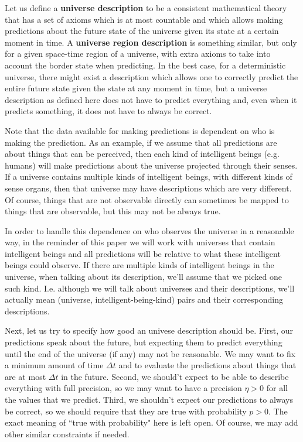 \documentclass[a4paper
,draft
]{article}
\newcommand{\definitie}[1]{\textbf{#1}}
\newcommand{\ghilimele}[1]{``#1"}
\begin{document}
Let us define a \definitie{universe description} to be a
consistent mathematical theory that has
a set of axioms which is at most countable and which allows making
predictions about the future state of the universe given its state
at a certain moment in time. A \definitie{universe region description}
is something similar, but only for a given space-time region of a universe,
with extra axioms to take into account the border state when predicting.
In the best case, for a deterministic universe, there might exist
a description which allows one to correctly predict the entire future state
given the state at any moment in time, but a universe description
as defined here does not have to predict everything and,
even when it predicts something, it does not have to always be correct.

Note that the data available for making predictions is dependent
on who is making the prediction. As an example, if we assume that
all predictions are about things that can be perceived, then
each kind of intelligent beings (e.g. humans) will make predictions
about the universe projected through their senses. If a universe contains
multiple kinds of intelligent beings, with different kinds of
sense organs, then that universe may have descriptions which are
very different.
Of course, things that are not observable directly can sometimes be mapped
to things that are observable, but this may not be always true.

In order to handle this dependence on who observes the universe
in a reasonable way, in the reminder of this paper we will work with universes
that contain intelligent beings
and all predictions will be relative to what these intelligent beings
could observe.
If there are multiple kinds of intelligent beings in the
universe, when talking about its description, we'll assume that we picked
one such kind.
I.e. although we
will talk about universes and their descriptions, we'll actually mean
(universe, intelligent-being-kind) pairs and their corresponding descriptions.

Next, let us try to specify how good an univese description
should be. First, our predictions speak about the future, but expecting them to
predict everything until the end of the universe (if any) may not be
reasonable. We may want to fix a minimum amount of time $\Delta t$
and to evaluate the predictions about things that are at most
$\Delta t$ in the future. Second, we should't expect to
be able to describe everything with full precision, so we may want to
have a precision $\eta>0$ for all the values that we predict.
Third, we shouldn't expect our predictions to always be correct, so
we should require that they are true with probability $p>0$.
The exact meaning of \ghilimele{true with probability} here is left open.
Of course, we may add other similar constraints if needed.
\end{document}

